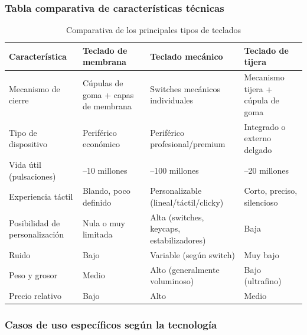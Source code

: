 \documentclass[12pt, letterpaper]{article}
\begin{document}
\subsubsection{Tabla comparativa de características técnicas}

\begin{table}[h!]
\centering
\small
\begin{tabular}{>{\raggedright\arraybackslash}p{2.5cm}>{\raggedright\arraybackslash}p{3.2cm}>{\raggedright\arraybackslash}p{3.2cm}>{\raggedright\arraybackslash}p{3.2cm}}
\toprule
\textbf{Característica} & \textbf{Teclado de membrana} & \textbf{Teclado mecánico} & \textbf{Teclado de tijera} \\
\midrule
Mecanismo de cierre & Cúpulas de goma + capas de membrana & Switches mecánicos individuales & Mecanismo tijera + cúpula de goma \\
Tipo de dispositivo & Periférico económico & Periférico profesional/premium & Integrado o externo delgado \\
Vida útil (pulsaciones) & 5--10 millones & 50--100 millones & 10--20 millones \\
Experiencia táctil & Blando, poco definido & Personalizable (lineal/táctil/clicky) & Corto, preciso, silencioso \\
Posibilidad de personalización & Nula o muy limitada & Alta (switches, keycaps, estabilizadores) & Baja \\
Ruido & Bajo & Variable (según switch) & Muy bajo \\
Peso y grosor & Medio & Alto (generalmente voluminoso) & Bajo (ultrafino) \\
Precio relativo & Bajo & Alto & Medio \\
\bottomrule
\end{tabular}
\caption{Comparativa de los principales tipos de teclados}
\label{tab:comparativa}
\end{table}

\FloatBarrier
\subsubsection{Casos de uso específicos según la tecnología}
\end{document}
